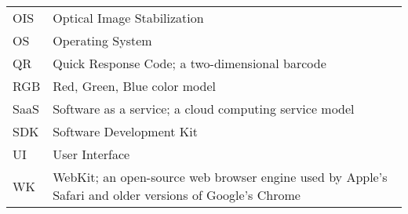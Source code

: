 \documentclass[thesis.tex]{subfiles}
\begin{document}
\begin{longtable}{@{}p{}p{}@{}}
OIS & Optical Image Stabilization \\
OS & Operating System \\
QR & Quick Response Code; a two-dimensional barcode \\
RGB & Red, Green, Blue color model \\
SaaS & Software as a service; a cloud computing service model \\
SDK & Software Development Kit \\
UI & User Interface \\
WK & WebKit; an open-source web browser engine used by Apple's Safari and older versions of Google's Chrome\\

\end{longtable}
\end{document}
